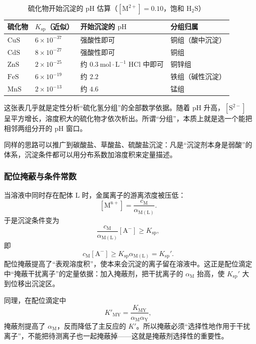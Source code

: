 \documentclass[UTF8]{ctexbook}
\begin{document}
\begin{table}[H]
\centering
\caption{硫化物开始沉淀的 $\mathrm{pH}$ 估算（$[\mathrm{M^{2+}}]=0.10$，饱和 $\mathrm{H_2S}$）}
\begin{tabular}{p{2.4cm}p{3.4cm}p{4.0cm}p{4.4cm}}
\toprule
硫化物 & $K_{\mathrm{sp}}$（近似） & 开始沉淀的 $\mathrm{pH}$ & 分组归属 \\
\midrule
$\mathrm{CuS}$ & $6\times10^{-37}$ & 强酸性即可 & 铜组（酸中沉淀） \\
$\mathrm{CdS}$ & $8\times10^{-27}$ & 强酸性即可 & 铜组 \\
$\mathrm{ZnS}$ & $2\times10^{-25}$ & 约 $0.3\ \mathrm{mol\cdot L^{-1}}$ $\mathrm{HCl}$ 中即可 & 铜锌组 \\
$\mathrm{FeS}$ & $6\times10^{-19}$ & 约 $2.2$ & 铁组（碱性沉淀） \\
$\mathrm{MnS}$ & $2\times10^{-13}$ & 约 $4.6$ & 锰组 \\
\bottomrule
\end{tabular}
\end{table}

这张表几乎就是定性分析“硫化氢分组”的全部数学依据。随着 $\mathrm{pH}$ 升高，$[\mathrm{S^{2-}}]$ 呈平方增长，溶度积大的硫化物才依次析出。所谓“分组”，本质上就是选一个能把相邻两组分开的 $\mathrm{pH}$ 窗口。

同样的思路可以推广到碳酸盐、草酸盐、硫酸盐沉淀：凡是“沉淀剂本身是弱酸”的体系，沉淀条件都可以用分布系数加溶度积来定量描述。

\subsubsection{配位掩蔽与条件常数}

当溶液中同时存在配体 $\mathrm{L}$ 时，金属离子的游离浓度被压低：
\[
[\mathrm{M^{n+}}]=\frac{c_{\mathrm{M}}}{\alpha_{\mathrm{M(L)}}}.
\]
于是沉淀条件变为
\[
\frac{c_{\mathrm{M}}}{\alpha_{\mathrm{M(L)}}}[\mathrm{A^-}]\ge K_{\mathrm{sp}},
\]
即
\[
c_{\mathrm{M}}[\mathrm{A^-}]\ge K_{\mathrm{sp}}\alpha_{\mathrm{M(L)}}=K_{\mathrm{sp}}'.
\]
配位掩蔽提高了“表观溶度积”，使本来会沉淀的离子留在溶液中。这正是配位滴定中“掩蔽干扰离子”的定量依据：加入掩蔽剂，把干扰离子的 $\alpha_{\mathrm{M}}$ 抬高，使 $K_{\mathrm{sp}}'$ 大到位移出沉淀区。

同理，在配位滴定中
\[
K'_{\mathrm{MY}}=\frac{K_{\mathrm{MY}}}{\alpha_{\mathrm{M}}\alpha_{\mathrm{Y}}},
\]
掩蔽剂提高了 $\alpha_{\mathrm{M}}$，反而降低了主反应的 $K'$。所以掩蔽必须“选择性地作用于干扰离子”，不能把待测离子也一起掩蔽掉——这就是掩蔽剂选择性的重要性。
\end{document}
